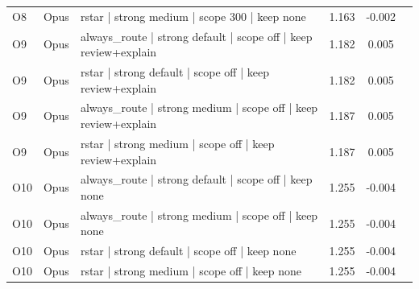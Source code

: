 \begin{xltabular}{\textwidth}{l l >{\raggedright\arraybackslash}X S[table-format=1.3] S[table-format=-1.3] c}
O8 & Opus & rstar | strong medium | scope 300 | keep none & 1.163 & -0.002 &  \\
O9 & Opus & always\_route | strong default | scope off | keep review+explain & 1.182 & 0.005 &  \\
O9 & Opus & rstar | strong default | scope off | keep review+explain & 1.182 & 0.005 &  \\
O9 & Opus & always\_route | strong medium | scope off | keep review+explain & 1.187 & 0.005 &  \\
O9 & Opus & rstar | strong medium | scope off | keep review+explain & 1.187 & 0.005 &  \\
O10 & Opus & always\_route | strong default | scope off | keep none & 1.255 & -0.004 &  \\
O10 & Opus & always\_route | strong medium | scope off | keep none & 1.255 & -0.004 &  \\
O10 & Opus & rstar | strong default | scope off | keep none & 1.255 & -0.004 &  \\
O10 & Opus & rstar | strong medium | scope off | keep none & 1.255 & -0.004 &  \\
\bottomrule
\end{xltabular}
